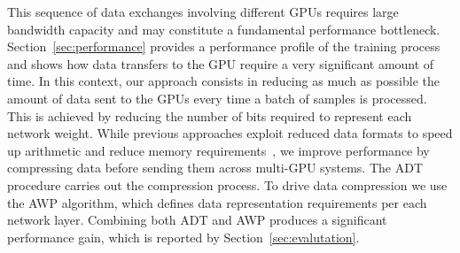 This sequence of data exchanges involving different GPUs requires large bandwidth capacity and may constitute a
fundamental performance bottleneck.
Section~\ref{sec:performance} provides a performance profile of the training process and shows how data transfers to the GPU require a very significant amount of time.
In this context, our approach consists in reducing as much as possible the amount 
of data sent to the GPUs every time a batch of samples is processed.
This is achieved by reducing 
the number of bits required to represent each network weight. 
While previous approaches exploit reduced data formats to speed up arithmetic and reduce memory requirements~\cite{Micikevicius2018}, we improve performance by compressing data before sending them across multi-GPU systems.
The ADT procedure carries out the compression process.
To drive data compression we use the AWP algorithm, which defines data representation requirements per each network layer.
Combining both ADT and AWP produces a significant performance gain, which is reported by Section~\ref{sec:evalutation}.

